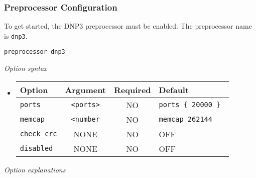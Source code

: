 \documentclass[english]{report}
\begin{document}
\subsubsection{Preprocessor Configuration}
To get started, the DNP3 preprocessor must be enabled.
The preprocessor name is \texttt{dnp3}.
\begin{verbatim}
preprocessor dnp3
\end{verbatim}
\textit{Option syntax}
\begin{itemize}
\item[]
\begin{tabular}{|l|c|c|p{6cm}|}
\hline
Option & Argument & Required & Default\\
\hline
\hline
\texttt{ports} & \texttt{<ports>} & NO & \texttt{ports \{ 20000 \} }\\
\texttt{memcap} & \texttt{<number} & NO & \texttt{memcap 262144}\\
\texttt{check\_crc} & NONE & NO & OFF\\
\texttt{disabled} & NONE & NO & OFF\\
\hline
\end{tabular}
\end{itemize}
\normalsize
\textit{Option explanations}
\end{document}
